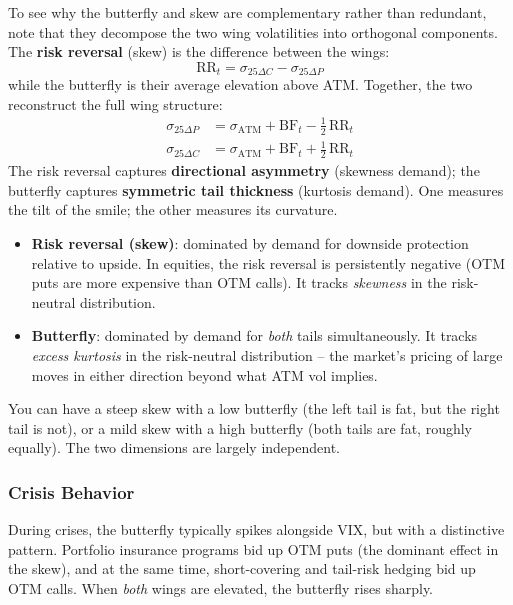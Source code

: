 To see why the butterfly and skew are complementary rather than redundant, note that they decompose the two wing volatilities into orthogonal components.
The \textbf{risk reversal} (skew) is the difference between the wings:
\[
  \mathrm{RR}_t = \sigma_{25\Delta C} - \sigma_{25\Delta P}
\]
while the butterfly is their average elevation above ATM.
Together, the two reconstruct the full wing structure:
\begin{align}
  \sigma_{25\Delta P} &= \sigma_{\mathrm{ATM}} + \mathrm{BF}_t - \tfrac{1}{2}\,\mathrm{RR}_t \label{eq:wing-put} \\
  \sigma_{25\Delta C} &= \sigma_{\mathrm{ATM}} + \mathrm{BF}_t + \tfrac{1}{2}\,\mathrm{RR}_t \label{eq:wing-call}
\end{align}
The risk reversal captures \textbf{directional asymmetry} (skewness demand); the butterfly captures \textbf{symmetric tail thickness} (kurtosis demand).
One measures the tilt of the smile; the other measures its curvature.

\begin{keyidea}
\begin{itemize}[nosep]
  \item \textbf{Risk reversal (skew)}: dominated by demand for downside protection relative to upside. In equities, the risk reversal is persistently negative (OTM puts are more expensive than OTM calls). It tracks \emph{skewness} in the risk-neutral distribution.
  \item \textbf{Butterfly}: dominated by demand for \emph{both} tails simultaneously. It tracks \emph{excess kurtosis} in the risk-neutral distribution -- the market's pricing of large moves in either direction beyond what ATM vol implies.
\end{itemize}
You can have a steep skew with a low butterfly (the left tail is fat, but the right tail is not), or a mild skew with a high butterfly (both tails are fat, roughly equally).
The two dimensions are largely independent.
\end{keyidea}

\subsubsection*{Crisis Behavior}

During crises, the butterfly typically spikes alongside VIX, but with a distinctive pattern.
Portfolio insurance programs bid up OTM puts (the dominant effect in the skew), and at the same time, short-covering and tail-risk hedging bid up OTM calls.
When \emph{both} wings are elevated, the butterfly rises sharply.

